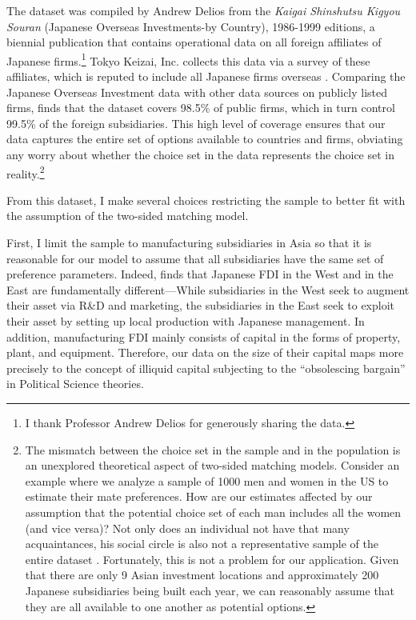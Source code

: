 The dataset was compiled by Andrew Delios from the \textit{Kaigai Shinshutsu
  Kigyou Souran} (Japanese Overseas Investments-by Country), 1986-1999 editions,
a biennial publication that contains operational data on all foreign affiliates
of Japanese firms.\footnote{I thank Professor Andrew Delios for generously
  sharing the data.} Tokyo Keizai, Inc. collects this data via a survey of these
affiliates, which is reputed to include all Japanese firms overseas
\citep{Yamawaki1991}. Comparing the Japanese Overseas Investment data with other
data sources on publicly listed firms, \citep{Delios2001} finds that the dataset
covers 98.5\% of public firms, which in turn control 99.5\% of the foreign
subsidiaries. This high level of coverage ensures that our data captures the
entire set of options available to countries and firms, obviating any worry
about whether the choice set in the data represents the choice set in
reality.\footnote{The mismatch between the choice set in the sample and in the
  population is an unexplored theoretical aspect of two-sided matching models.
  Consider an example where we analyze a sample of 1000 men and women in the US
  to estimate their mate preferences. How are our estimates affected by our
  assumption that the potential choice set of each man includes all the women
  (and vice versa)? Not only does an individual not have that many
  acquaintances, his social circle is also not a representative sample of the
  entire dataset \citep[568]{Logan2008}. Fortunately, this is not a problem for
  our application. Given that there are only 9 Asian investment locations and
  approximately 200 Japanese subsidiaries being built each year, we can
  reasonably assume that they are all available to one another as potential
  options.}

From this dataset, I make several choices restricting the sample to better fit
with the assumption of the two-sided matching model.

First, I limit the sample to manufacturing subsidiaries in Asia so that it is reasonable
for our model to assume
that all subsidiaries have the same set of preference parameters. Indeed,
\citep{Pak2005} finds that Japanese FDI in the West and in the East are
fundamentally different---While subsidiaries in the West seek
to augment their asset via R\&D and marketing, the subsidiaries in the East seek to exploit their
asset by setting up local production with Japanese management. In addition, manufacturing FDI mainly
consists of capital in the forms of property, plant, and equipment.
Therefore, our data on the size of their capital maps more precisely to the
concept of illiquid capital subjecting to the ``obsolescing bargain'' in
Political Science theories.

